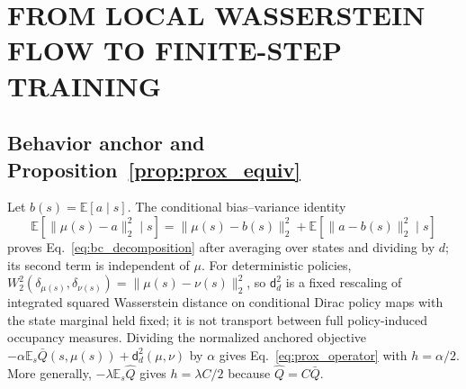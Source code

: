 \documentclass[twoside]{article}
\begin{document}
\onecolumn
{}
\appendix

\section{FROM LOCAL WASSERSTEIN FLOW TO FINITE-STEP TRAINING}
\label{app:proofs}

\subsection{Behavior anchor and Proposition~\ref{prop:prox_equiv}}
Let $b(s)=\mathbb E[a\mid s]$. The conditional bias--variance identity
\[
\mathbb E[\|\mu(s)-a\|_2^2\mid s]
=\|\mu(s)-b(s)\|_2^2+
\mathbb E[\|a-b(s)\|_2^2\mid s]
\]
proves Eq.~\eqref{eq:bc_decomposition} after averaging over states and dividing
by $d$; its second term is independent of $\mu$. For deterministic policies,
$W_2^2(\delta_{\mu(s)},\delta_{\nu(s)})=\|\mu(s)-\nu(s)\|_2^2$, so
$\mathsf d_d^2$ is a fixed rescaling of integrated squared Wasserstein
distance on conditional Dirac policy maps with the state marginal held fixed;
it is not transport between full policy-induced occupancy measures. Dividing
the normalized anchored objective
$-\alpha\mathbb E_s\bar Q(s,\mu(s))+\mathsf d_d^2(\mu,\nu)$ by $\alpha$
gives Eq.~\eqref{eq:prox_operator} with $h=\alpha/2$. More generally,
$-\lambda\mathbb E_s\widehat Q$ gives $h=\lambda C/2$ because
$\widehat Q=C\bar Q$.
\end{document}
